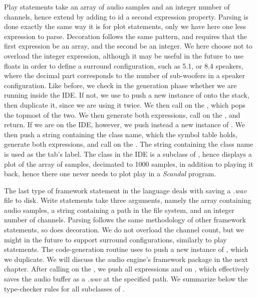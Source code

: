 Play statements take an array of audio samples and an integer number of channels, hence extend  by adding to id a second expression property. Parsing is done exactly the same way it is for plot statements, only we have here one less expression to parse. Decoration follows the same pattern, and requires that the first expression be an array, and the second be an integer. We here choose not to overload the integer expression, although it may be useful in the future to use floats in order to define a surround configuration, such as 5.1, or 8.4 speakers, where the decimal part corresponds to the number of sub-woofers in a speaker configuration. Like before, we check in the generation phase whether we are running inside the IDE. If not, we use  to push a new instance of  onto the stack, then duplicate it, since we are using it twice. We then call  on the , which pops the topmost of the two. We then generate both expressions, call  on the , and return. If we are on the IDE, however, we push instead a new instance of . We then push a string containing the class name, which the symbol table holds, generate both expressions, and call  on the . The string containing the class name is used as the tab's label. The  class in the IDE is a subclass of , hence displays a plot of the array of samples, decimated to 1000 samples, in addition to playing it back, hence there one never needs to plot  play in a \emph{Scandal} program.

The last type of framework statement in the language deals with saving a \emph{.wav} file to disk. Write statements take three arguments, namely the array containing audio samples, a string containing a path in the file system, and an integer number of channels. Parsing follows the same methodology of other framework statements, so does decoration. We do not overload the channel count, but we might in the future to support surround configurations, similarly to play statements. The code-generation routine uses  to push a new instance of , which we duplicate. We will discuss the audio engine's framework package in the next chapter. After calling  on the , we push all expressions and  on , which effectively saves the audio buffer as a \emph{.wav} at the specified path. We summarize below the type-checker rules for all subclasses of .

